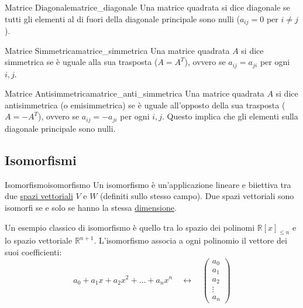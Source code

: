 \documentclass{article}
\begin{document}
\begin{definition}{Matrice Diagonale}{matrice_diagonale}
Una matrice quadrata si dice diagonale se tutti gli elementi al di fuori della diagonale principale sono nulli ($a_{ij} = 0$ per $i \neq j$).
\end{definition}

\begin{definition}{Matrice Simmetrica}{matrice_simmetrica}
Una matrice quadrata $A$ si dice simmetrica se è uguale alla sua trasposta ($A = A^T$), ovvero se $a_{ij} = a_{ji}$ per ogni $i,j$.
\end{definition}

\begin{definition}{Matrice Antisimmetrica}{matrice_anti_simmetrica}
Una matrice quadrata $A$ si dice antisimmetrica (o emisimmetrica) se è uguale all'opposto della sua trasposta ($A = -A^T$), ovvero se $a_{ij} = -a_{ji}$ per ogni $i,j$.
Questo implica che gli elementi sulla diagonale principale sono nulli.
\end{definition}

\subsection{Isomorfismi}

\begin{definition}{Isomorfismo}{isomorfismo}
    Un isomorfismo è un'applicazione lineare e biiettiva tra due \hyperref[def:spazio_vettoriale]{spazi vettoriali} $V$ e $W$ (definiti sullo stesso campo).
    Due spazi vettoriali sono isomorfi se e solo se hanno la stessa \hyperref[def:dimensione_spazio_vettoriale]{dimensione}.
\end{definition}

Un esempio classico di isomorfismo è quello tra lo spazio dei polinomi $\mathbb{R}[x]_{\le n}$ e lo spazio vettoriale $\mathbb{R}^{n+1}$.
L'isomorfismo associa a ogni polinomio il vettore dei suoi coefficienti:
\[ a_0 + a_1 x + a_2 x^2 + \dots + a_n x^n \quad \longleftrightarrow \quad \begin{pmatrix}
    a_0 \\
    a_1 \\
    a_2 \\
    \vdots \\
    a_n
\end{pmatrix} \]
\end{document}
